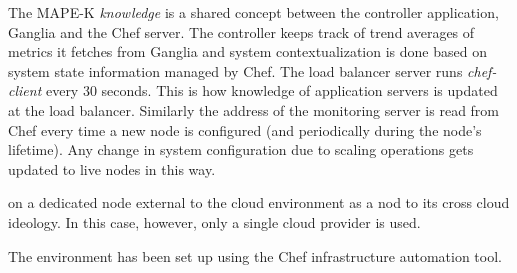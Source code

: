 \documentclass[english]{tktltiki2}
\theoremstyle{definition}
\theoremstyle{remark}
\begin{document}
The MAPE-K \textit{knowledge} is a shared concept between the controller
application, Ganglia and the Chef server. The controller keeps track of trend
averages of metrics it fetches from Ganglia and system contextualization is done
based on system state information managed by Chef. The load balancer server runs
\textit{chef-client} every 30 seconds. This is how knowledge of application
servers is updated at the load balancer. Similarly the address of the monitoring
server is read from Chef every time a new node is configured (and periodically
during the node's lifetime). Any change in system configuration due to scaling
operations gets updated to live nodes in this way.


on a dedicated node external to
the cloud environment as a nod to its cross cloud ideology. In this case,
however, only a single cloud provider is used.


The environment has been set up using the Chef infrastructure automation tool.



\begin{center}

	\begin{table}[h]
	    \caption{Server applications and tools used in the prototype.}
	    \label{table:QoEFactors}

	\end{table}

\end{center}
\end{document}
